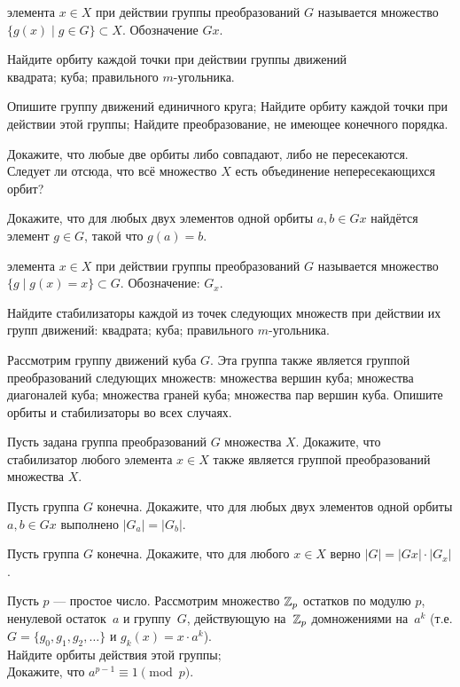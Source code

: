 \documentclass[a4paper,12pt]{article}
\begin{document}


  элемента $x \in X$ при действии группы преобразований $G$ называется множество $\{g(x) \mid g \in G\} \subset X$.
 Обозначение $Gx$.

Найдите орбиту каждой точки при действии группы движений\\
квадрата;
куба;
правильного $m$-угольника.



Опишите группу движений единичного круга;
Найдите орбиту каждой точки при действии этой группы;
Найдите преобразование, не имеющее конечного порядка.

Докажите, что любые две орбиты либо совпадают, либо не пересекаются. Следует ли отсюда,
что всё множество $X$ есть объединение непересекающихся орбит?

Докажите, что для любых двух элементов одной орбиты $a,b \in Gx$ найдётся элемент $g \in G$,
такой что $g(a) = b$.


  элемента $x \in X$ при действии группы преобразований $G$ называется
множество $\{g \mid g(x)=x\} \subset G$.
 Обозначение: $G_x$.

Найдите стабилизаторы каждой из точек следующих множеств при действии их групп движений:
квадрата;
куба;
правильного $m$-угольника.

Рассмотрим группу движений куба $G$. Эта группа также является группой преобразований следующих множеств:
 множества вершин куба;
 множества диагоналей куба;
 множества граней куба;
 множества пар вершин куба.
Опишите орбиты и стабилизаторы во всех случаях.

Пусть задана группа преобразований $G$ множества $X$. Докажите, что стабилизатор
любого элемента $x\in X$ также является группой преобразований множества $X$.

Пусть группа $G$ конечна. Докажите, что для любых двух элементов одной орбиты $a,b \in Gx$ выполнено $|G_a| = |G_b|$.

Пусть группа $G$ конечна. Докажите, что для любого $x \in X$ верно $|G| = |Gx| \cdot |G_x|$.

Пусть $p$ --- простое число.
Рассмотрим множество $\mathbb{Z}_p$ остатков по модулю $p$, ненулевой остаток~$a$ и группу~$G$, действующую на~$\mathbb{Z}_p$ домножениями на~$a^k$
(т.е. $G=\{g_0, g_1, g_2,\ldots\}$ и $g_k(x) = x\cdot a^k$).
\\ Найдите орбиты действия этой группы;
\\ Докажите, что $a^{p-1} \equiv 1 \pmod{p}$.
\end{document}

